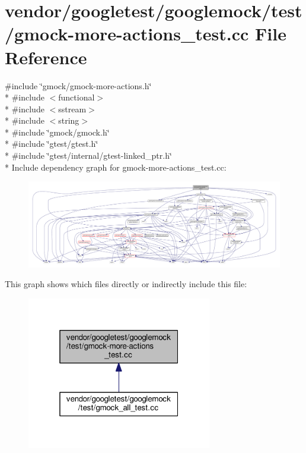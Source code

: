 \hypertarget{gmock-more-actions__test_8cc}{}\section{vendor/googletest/googlemock/test/gmock-\/more-\/actions\+\_\+test.cc File Reference}
\label{gmock-more-actions__test_8cc}
{\ttfamily \#include \char`\"{}gmock/gmock-\/more-\/actions.\+h\char`\"{}}\\*
{\ttfamily \#include $<$functional$>$}\\*
{\ttfamily \#include $<$sstream$>$}\\*
{\ttfamily \#include $<$string$>$}\\*
{\ttfamily \#include \char`\"{}gmock/gmock.\+h\char`\"{}}\\*
{\ttfamily \#include \char`\"{}gtest/gtest.\+h\char`\"{}}\\*
{\ttfamily \#include \char`\"{}gtest/internal/gtest-\/linked\+\_\+ptr.\+h\char`\"{}}\\*
Include dependency graph for gmock-\/more-\/actions\+\_\+test.cc\+:\nopagebreak
\begin{figure}[H]
\begin{center}
\leavevmode
\includegraphics[width=350pt]{gmock-more-actions__test_8cc__incl}
\end{center}
\end{figure}
This graph shows which files directly or indirectly include this file\+:\nopagebreak
\begin{figure}[H]
\begin{center}
\leavevmode
\includegraphics[width=229pt]{gmock-more-actions__test_8cc__dep__incl}
\end{center}
\end{figure}

